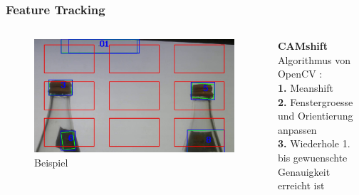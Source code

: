 \documentclass{beamer}
\newcommand{\currentSD}{}
\begin{document}
\begin{frame}
\frametitle{Feature Tracking}
    \begin{columns}
    \begin{column}{0.3\textwidth}
        \begin{figure}
            \includegraphics[scale=0.125]{tracking-example.jpg}
            \caption{Beispiel}
        \end{figure}
    \end{column}
    \begin{column}{0.67\textwidth}
            \textbf{CAMshift} Algorithmus von OpenCV \cite{OpenCVMe72:online}:\\[0.7em]
                \textbf{1.} Meanshift\\
                \textbf{2.} Fenstergroesse und Orientierung anpassen\\
                \textbf{3.} Wiederhole 1. bis gewuenschte Genauigkeit erreicht ist
    \end{column}
    \end{columns}
    \renewcommand{\currentSD}{\draw[red,thick,dotted] ($(analysis1.north west)+(-0.2,0.2)$)  rectangle ($(analysis1.south east)+(0.2,-0.2)$);}
    
\end{frame}
\end{document}
